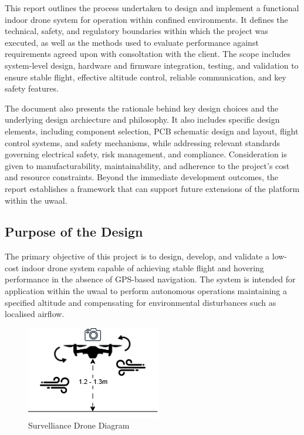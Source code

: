 This report outlines the  process undertaken to design and implement a functional indoor drone system for operation within confined environments. It defines the technical, safety, and regulatory boundaries within which the project was executed, as well as the methods used to evaluate performance against requirements agreed upon with consoltation with the client. The scope includes system-level design, hardware and firmware integration, testing, and validation to ensure stable flight, effective altitude control, reliable communication, and key safety features. 

The document also presents the rationale behind key design choices and the underlying design archiecture and philosophy. It also includes specific design elements, including component selection, PCB schematic design and layout, flight control systems, and safety mechanisms, while addressing relevant standards governing electrical safety, risk management, and compliance. Consideration is given to manufacturability, maintainability, and adherence to the project’s cost and resource constraints. Beyond the immediate development outcomes, the report establishes a framework that can support future extensions of the platform within the \gls{uwaal}.

\subsection{Purpose of the Design}
The primary objective of this project is to design, develop, and validate a low-cost indoor drone system capable of achieving stable flight and hovering performance in the absence of GPS-based navigation. The system is intended for application within the \gls{uwaal} to perform autonomous operations maintaining a specified altitude and compensating for environmental disturbances such as localised airflow. 

\begin{figure}[H]
    \centering
    \captionsetup{justification=centering, margin=1cm}
    \includegraphics[width=0.4
    \textwidth]{img/intro-drone-gray4.PNG}
    \caption{Survelliance Drone Diagram}
\end{figure}

